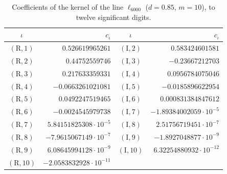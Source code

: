 \documentclass[11pt,reqno]{amsart}
\numberwithin{equation}{section}
\theoremstyle{definition}
\theoremstyle{remark}
\begin{document}
\begin{table}[ht]\centering\small
\begin{tabular}{@{}cr@{\quad}cr@{}}\toprule $\iota$ & $c_\iota$ & $\iota$ & $c_\iota$\\\midrule
$(\mathrm R,1)$ & $0.526619965261$ & $(\mathrm I,2)$ & $0.583424601581$\\
$(\mathrm R,2)$ & $0.44752559746$ & $(\mathrm I,3)$ & $-0.23667212703$\\
$(\mathrm R,3)$ & $0.217633359331$ & $(\mathrm I,4)$ & $0.0956784075046$\\
$(\mathrm R,4)$ & $-0.0663261021081$ & $(\mathrm I,5)$ & $-0.0185896622954$\\
$(\mathrm R,5)$ & $0.0492247519465$ & $(\mathrm I,6)$ & $0.000831384847612$\\
$(\mathrm R,6)$ & $-0.0024545979738$ & $(\mathrm I,7)$ & $-1.89384002059\cdot10^{-5}$\\
$(\mathrm R,7)$ & $5.84151825308\cdot10^{-5}$ & $(\mathrm I,8)$ & $2.51756719451\cdot10^{-7}$\\
$(\mathrm R,8)$ & $-7.9615067149\cdot10^{-7}$ & $(\mathrm I,9)$ & $-1.8927048877\cdot10^{-9}$\\
$(\mathrm R,9)$ & $6.08645994128\cdot10^{-9}$ & $(\mathrm I,10)$ & $6.32254880932\cdot10^{-12}$\\
$(\mathrm R,10)$ & $-2.0583832928\cdot10^{-11}$ & & \\
\bottomrule\end{tabular}
\caption{Coefficients of the kernel of the line $\ell_{6000}$ ($d=0.85$, $m=10$), to twelve significant digits.}\label{tab:kernel_D6000}\end{table}

\end{document}
